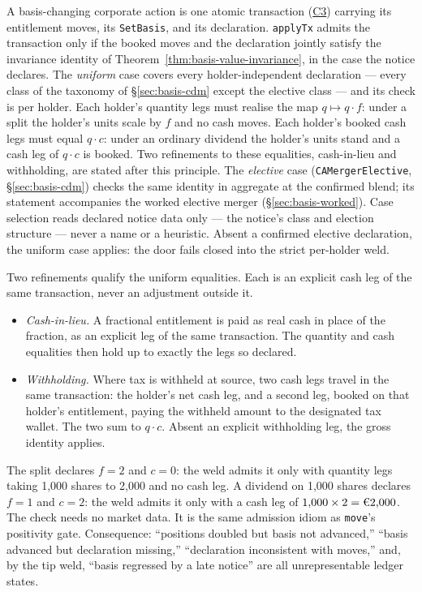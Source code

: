 \begin{principle}
\label{prin:invariance-weld}
A basis-changing corporate action is one atomic transaction
(\hyperref[cond:C3]{C3}) carrying its entitlement moves, its \texttt{SetBasis},
and its declaration. \texttt{applyTx} admits the transaction only if the
booked moves and the declaration jointly satisfy the invariance identity of
Theorem~\ref{thm:basis-value-invariance}, in the case the notice declares.
The \emph{uniform} case covers every holder-independent declaration --- every
class of the taxonomy of \S\ref{sec:basis-cdm} except the elective class ---
and its check is per holder. Each holder's quantity legs must realise the map
$q\mapsto q\cdot f$: under a split the holder's units scale by $f$ and no
cash moves. Each holder's booked cash legs must equal $q\cdot c$: under an
ordinary dividend the holder's units stand and a cash leg of $q\cdot c$ is
booked. Two refinements to these equalities, cash-in-lieu and withholding,
are stated after this principle. The \emph{elective} case
(\texttt{CAMergerElective}, \S\ref{sec:basis-cdm}) checks the same identity
in aggregate at the confirmed blend; its statement accompanies the worked
elective merger (\S\ref{sec:basis-worked}).
Case selection reads declared notice data only --- the notice's class and
election structure --- never a name or a heuristic. Absent a confirmed
elective declaration, the uniform case applies: the door fails closed into
the strict per-holder weld.
\end{principle}

Two refinements qualify the uniform equalities. Each is an explicit cash leg
of the same transaction, never an adjustment outside it.

\begin{itemize}[nosep]
\item \emph{Cash-in-lieu.} A fractional entitlement is paid as real cash in
place of the fraction, as an explicit leg of the same transaction. The
quantity and cash equalities then hold up to exactly the legs so declared.
\item \emph{Withholding.} Where tax is withheld at source, two cash legs
travel in the same transaction: the holder's net cash leg, and a second leg,
booked on that holder's entitlement, paying the withheld amount to the
designated tax wallet. The two sum to $q\cdot c$. Absent an explicit
withholding leg, the gross identity applies.
\end{itemize}

The split declares $f=2$ and $c=0$: the weld admits it only with quantity legs
taking 1{,}000 shares to 2{,}000 and no cash leg. A  dividend on 1{,}000
shares declares $f=1$ and $c=2$: the weld admits it only with a cash leg of
$1{,}000\times2=\EUR{2{,}000}$. The check needs no market data. It is the same
admission idiom as \texttt{move}'s positivity gate. Consequence: ``positions
doubled but basis not advanced,'' ``basis advanced but declaration missing,''
``declaration inconsistent with moves,'' and, by the tip weld, ``basis
regressed by a late notice'' are all unrepresentable ledger states.

